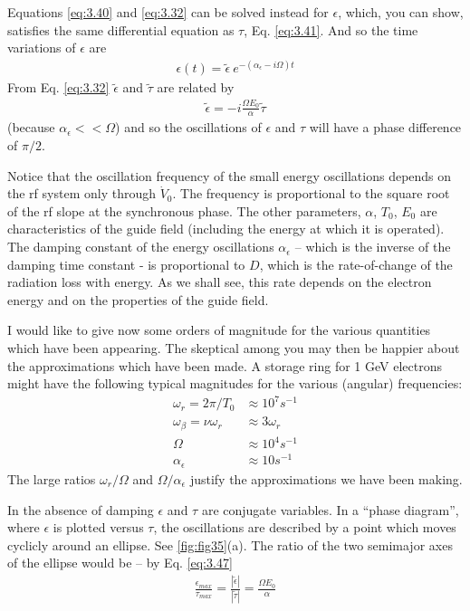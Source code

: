 Equations \eqref{eq:3.40} and \eqref{eq:3.32} can be solved instead for $\epsilon$, which, you can show, satisfies the same differential equation as $\tau$, Eq. \eqref{eq:3.41}. And so the time variations of $\epsilon$ are
\begin{align}
	\epsilon(t) = \tilde{\epsilon}\ e^{-(\alpha_\epsilon - i\Omega)t}
\end{align}
From Eq. \eqref{eq:3.32} $\tilde{\epsilon}$ and $\tilde{\tau}$ are related by
\begin{align}
	\tilde{\epsilon} = -i\frac{\Omega E_0}{\alpha}\tilde{\tau}\label{eq:3.47}
\end{align}
(because $\alpha_\epsilon << \Omega$) and so the oscillations of $\epsilon$ and $\tau$ will have a phase difference of $\pi/2$.

Notice that the oscillation frequency of the small energy oscillations depends on the rf system only through $\dot{V}_0$. The frequency is proportional to the square root of the rf slope at the synchronous phase. The other parameters, $\alpha$, $T_0$, $E_0$ are characteristics of the guide field (including the energy at which it is operated). The damping constant of the energy oscillations $\alpha_\epsilon$ -- which is the inverse of the damping time constant - is proportional to $D$, which is the rate-of-change of the radiation loss with energy. As we shall see, this rate depends on the electron energy and on the properties of the guide field.

I would like to give now some orders of magnitude for the various quantities which have been appearing. The skeptical among you may then be happier about the approximations which have been made. A storage ring for 1 GeV electrons might have the following typical magnitudes for the various (angular) frequencies:
\begin{align*}
	\omega_r = 2\pi /T_0 &\approx 10^7 s^{-1}\\
	\omega_\beta = \nu \omega_r &\approx 3\omega_r\\
	\Omega &\approx 10^4 s^{-1}\\
	\alpha_\epsilon &\approx 10 s^{-1}
\end{align*}
The large ratios $\omega_r/\Omega$ and $\Omega/\alpha_\epsilon$ justify the approximations we have been making.

In the absence of damping $\epsilon$ and $\tau$ are conjugate variables. In a ``phase diagram'', where $\epsilon$ is plotted versus $\tau$, the oscillations are described by a point which moves cyclicly around an ellipse. See \autoref{fig:fig35}(a). The ratio of the two semimajor axes of the ellipse would be -- by Eq. \eqref{eq:3.47}
\begin{align}
	\frac{\epsilon_{max}}{\tau_{max}} = \frac{|\tilde{\epsilon}|}{|\tilde{\tau}|} = \frac{\Omega E_0}{\alpha}
\end{align}

